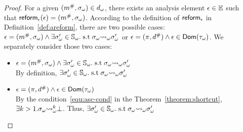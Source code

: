 \begin{proof}
  For a given $({m}^{\#}, {\sigma}_\omega) \in {{d}_\omega}$, there exists an analysis
  element $\epsilon \in \mathbb{E}$ such that $\textsf{reform}_\epsilon(\epsilon) = ({m}^{\#},
  {\sigma}_\omega)$.  According to the definition of $\textsf{reform}_\epsilon$ in
  Definition~\ref{def:areform}, there are two possible cases: $\epsilon =
  ({m}^{\#}, {\sigma}_\omega) \wedge \exists {\sigma}_\omega' \in {\mathbb{S}}_\omega. \; \text{s.t} \;
  {\sigma}_\omega {\leadsto}_\omega {\sigma}_\omega'$ or $\epsilon = (\pi, {d}^{\#}) \wedge \epsilon \in
  \textsf{Dom}({\tau}_\omega)$. We separately consider those two cases:
  \begin{itemize}
    \item $\epsilon = ({m}^{\#}, {\sigma}_\omega) \wedge \exists {\sigma}_\omega' \in {\mathbb{S}}_\omega.
      \; \text{s.t} \; {\sigma}_\omega {\leadsto}_\omega {\sigma}_\omega'$\\
        By definition, $\exists {\sigma}_\omega' \in {\mathbb{S}}_\omega.  \; \text{s.t} \;
        {\sigma}_\omega {\leadsto}_\omega {\sigma}_\omega'$
    \item $\epsilon = (\pi, {d}^{\#}) \wedge \epsilon \in \textsf{Dom}({\tau}_\omega)$\\
      By the condition~\ref{equ:asc-cond} in the Theorem~\ref{theorem:shortcut},\\
      $\exists k > 1. {\sigma}_\omega {\leadsto}_\omega^k \bot$.  Thus, $\exists {\sigma}_\omega' \in
      {\mathbb{S}}_\omega.  \; \text{s.t} \; {\sigma}_\omega {\leadsto}_\omega {\sigma}_\omega'$
  \end{itemize}
\end{proof}

